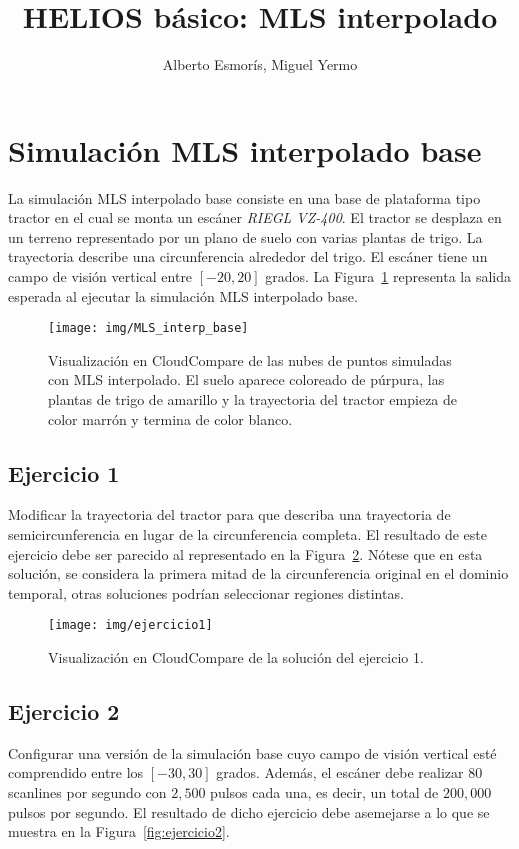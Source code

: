 \documentclass[]{article}
\title{HELIOS básico: MLS interpolado}
\author{Alberto Esmorís, Miguel Yermo}
\date{}
\begin{document}
	
	\maketitle
	
	
	
	\section*{Simulación MLS interpolado base}
	La simulación MLS interpolado base consiste en una base de plataforma tipo tractor en el cual se monta un escáner \textit{RIEGL VZ-400}. El tractor se desplaza en un terreno representado por un plano de suelo con varias plantas de trigo. La trayectoria describe una circunferencia alrededor del trigo. El escáner tiene un campo de visión vertical entre $[-20, 20]$ grados. La Figura~\ref{fig:mls_interp_base} representa la salida esperada al ejecutar la simulación MLS interpolado base.
	
	\begin{figure}[htb]
		\centering
		\texttt{[image: img/MLS\_interp\_base]}
		\caption{Visualización en CloudCompare de las nubes de puntos simuladas con MLS interpolado. El suelo aparece coloreado de púrpura, las plantas de trigo de amarillo y la trayectoria del tractor empieza de color marrón y termina de color blanco.}
		\label{fig:mls_interp_base}
	\end{figure}


	\pagebreak
	

	\subsection*{Ejercicio 1}
	Modificar la trayectoria del tractor para que describa una trayectoria de semicircunferencia en lugar de la circunferencia completa. El resultado de este ejercicio debe ser parecido al representado en la Figura~\ref{fig:ejercicio1}. Nótese que en esta solución, se considera la primera mitad de la circunferencia original en el dominio temporal, otras soluciones podrían seleccionar regiones distintas.
	
	\begin{figure}[htb]
		\centering
		\texttt{[image: img/ejercicio1]}
		\caption{Visualización en CloudCompare de la solución del ejercicio 1.}
		\label{fig:ejercicio1}
	\end{figure}


	\subsection*{Ejercicio 2}
	Configurar una versión de la simulación base cuyo campo de visión vertical esté comprendido entre los $[-30, 30]$ grados. Además, el escáner debe realizar $80$ scanlines por segundo con $2,500$ pulsos cada una, es decir, un total de $200,000$ pulsos por segundo. El resultado de dicho ejercicio debe asemejarse a lo que se muestra en la Figura~\ref{fig:ejercicio2}.
	
\end{document}

